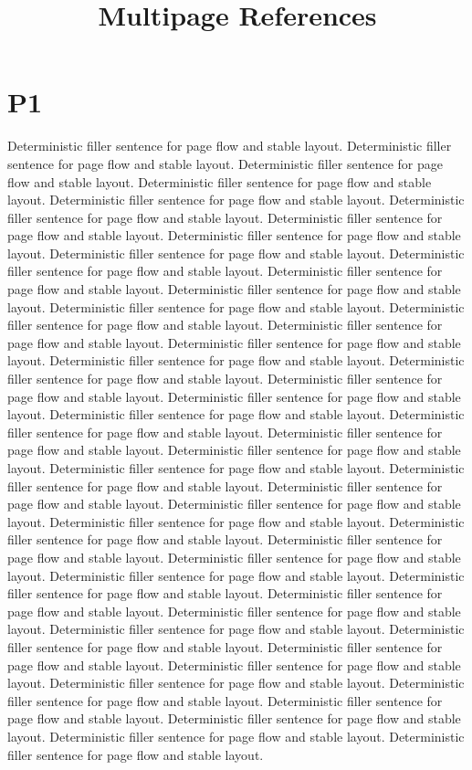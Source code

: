 \documentclass{article}
\begin{document}
\title{Multipage References}\maketitle
\section{P1}\label{sec:p1}Deterministic filler sentence for page flow and stable layout. Deterministic filler sentence for page flow and stable layout. Deterministic filler sentence for page flow and stable layout. Deterministic filler sentence for page flow and stable layout. Deterministic filler sentence for page flow and stable layout. Deterministic filler sentence for page flow and stable layout. Deterministic filler sentence for page flow and stable layout. Deterministic filler sentence for page flow and stable layout. Deterministic filler sentence for page flow and stable layout. Deterministic filler sentence for page flow and stable layout. Deterministic filler sentence for page flow and stable layout. Deterministic filler sentence for page flow and stable layout. Deterministic filler sentence for page flow and stable layout. Deterministic filler sentence for page flow and stable layout. Deterministic filler sentence for page flow and stable layout. Deterministic filler sentence for page flow and stable layout. Deterministic filler sentence for page flow and stable layout. Deterministic filler sentence for page flow and stable layout. Deterministic filler sentence for page flow and stable layout. Deterministic filler sentence for page flow and stable layout. Deterministic filler sentence for page flow and stable layout. Deterministic filler sentence for page flow and stable layout. Deterministic filler sentence for page flow and stable layout. Deterministic filler sentence for page flow and stable layout. Deterministic filler sentence for page flow and stable layout. Deterministic filler sentence for page flow and stable layout. Deterministic filler sentence for page flow and stable layout. Deterministic filler sentence for page flow and stable layout. Deterministic filler sentence for page flow and stable layout. Deterministic filler sentence for page flow and stable layout. Deterministic filler sentence for page flow and stable layout. Deterministic filler sentence for page flow and stable layout. Deterministic filler sentence for page flow and stable layout. Deterministic filler sentence for page flow and stable layout. Deterministic filler sentence for page flow and stable layout. Deterministic filler sentence for page flow and stable layout. Deterministic filler sentence for page flow and stable layout. Deterministic filler sentence for page flow and stable layout. Deterministic filler sentence for page flow and stable layout. Deterministic filler sentence for page flow and stable layout. Deterministic filler sentence for page flow and stable layout. Deterministic filler sentence for page flow and stable layout. Deterministic filler sentence for page flow and stable layout. Deterministic filler sentence for page flow and stable layout. Deterministic filler sentence for page flow and stable layout. Deterministic filler sentence for page flow and stable layout. 
\end{document}
